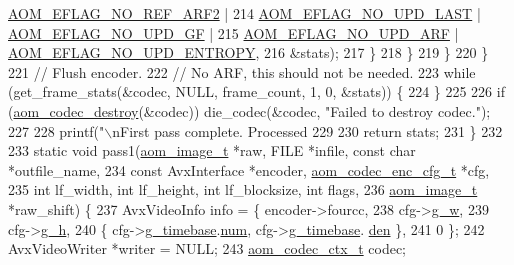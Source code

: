 \begin{DoxyCodeInclude}
{{{      \hyperlink{group__aom__encoder_gad04799a74215e1b9609f7ccd1766f8c9}{AOM\_EFLAG\_NO\_REF\_ARF2} |
214                               \hyperlink{group__aom__encoder_ga7a55a46970c074b761319c5c46d87b6e}{AOM\_EFLAG\_NO\_UPD\_LAST} | 
      \hyperlink{group__aom__encoder_gaa81cc31f95fd463f51a158050d267a36}{AOM\_EFLAG\_NO\_UPD\_GF} |
215                               \hyperlink{group__aom__encoder_ga469b4cf5ff76cb30de951e129c25a786}{AOM\_EFLAG\_NO\_UPD\_ARF} | 
      \hyperlink{group__aom__encoder_gac5a69f04b0bc88f755587a1da815d754}{AOM\_EFLAG\_NO\_UPD\_ENTROPY},
216                           &stats);
217         \}
218       \}
219     \}
220   \}
221   \textcolor{comment}{// Flush encoder.}
222   \textcolor{comment}{// No ARF, this should not be needed.}
223   \textcolor{keywordflow}{while} (get\_frame\_stats(&codec, NULL, frame\_count, 1, 0, &stats)) \{
224   \}
225 
226   \textcolor{keywordflow}{if} (\hyperlink{group__codec_ga9b60e186f61ba2d6ab2b8069b76a15c5}{aom\_codec\_destroy}(&codec)) die\_codec(&codec, \textcolor{stringliteral}{"Failed to destroy codec."});
227 
228   printf(\textcolor{stringliteral}{"\(\backslash\)nFirst pass complete. Processed %
229 
230   \textcolor{keywordflow}{return} stats;
231 \}
232 
233 \textcolor{keyword}{static} \textcolor{keywordtype}{void} pass1(\hyperlink{structaom__image}{aom\_image\_t} *raw, FILE *infile, \textcolor{keyword}{const} \textcolor{keywordtype}{char} *outfile\_name,
234                   \textcolor{keyword}{const} AvxInterface *encoder, \hyperlink{structaom__codec__enc__cfg}{aom\_codec\_enc\_cfg\_t} *cfg,
235                   \textcolor{keywordtype}{int} lf\_width, \textcolor{keywordtype}{int} lf\_height, \textcolor{keywordtype}{int} lf\_blocksize, \textcolor{keywordtype}{int} flags,
236                   \hyperlink{structaom__image}{aom\_image\_t} *raw\_shift) \{
237   AvxVideoInfo info = \{ encoder->fourcc,
238                         cfg->\hyperlink{structaom__codec__enc__cfg_a80cb459c5ef3c7e1516f617c4c9d6eab}{g\_w},
239                         cfg->\hyperlink{structaom__codec__enc__cfg_a37b0f57b63bec8d133df8901d4407ee6}{g\_h},
240                         \{ cfg->\hyperlink{structaom__codec__enc__cfg_a10664f1fc5b6ec29b77ee13efeeecdf7}{g\_timebase}.\hyperlink{structaom__rational_a7b48174411798c780a15f132c4650839}{num}, cfg->\hyperlink{structaom__codec__enc__cfg_a10664f1fc5b6ec29b77ee13efeeecdf7}{g\_timebase}.
      \hyperlink{structaom__rational_adeddf2ea01c12b7be66536e0a0fb92c5}{den} \},
241                         0 \};
242   AvxVideoWriter *writer = NULL;
243   \hyperlink{structaom__codec__ctx}{aom\_codec\_ctx\_t} codec;
}}}}
\end{DoxyCodeInclude}
